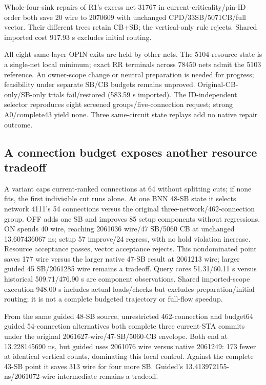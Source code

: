\documentclass[conference,10pt]{IEEEtran}
\begin{document}
Whole-four-sink repairs of R1's excess net 31767 in current-criticality/pin-ID order both save 20 wire to 2070609 with unchanged CPD/33SB/5071CB/full vector. Their different trees retain CB+SB; the vertical-only rule rejects. Shared imported cost 917.93 s excludes initial routing.

All eight same-layer OPIN exits are held by other nets. The 5104-resource state is a single-net local minimum; exact RR terminals across 78450 nets admit the 5103 reference. An owner-scope change or neutral preparation is needed for progress; feasibility under separate SB/CB budgets remains unproved. Original-CB-only/SB-only trials fail/restored (583.59 s imported). The ID-independent selector reproduces eight screened groups/five-connection request; strong A0/complete43 yield none. Three same-circuit state replays add no native repair outcome.

\subsection{A connection budget exposes another resource tradeoff}
A variant caps current-ranked connections at 64 without splitting cuts; if none fits, the first indivisible cut runs alone. At one BNN 48-SB state it selects network 4111's 54 connections versus the original three-network/462-connection group. OFF adds one SB and improves 85 setup components without regressions. ON spends 40 wire, reaching 2061036 wire/47 SB/5060 CB at unchanged 13.607436067 ns; setup 57 improve/24 regress, with no hold violation increase. Resource acceptance passes, vector acceptance rejects. This nondominated point saves 177 wire versus the larger native 47-SB result at 2061213 wire; larger guided 45 SB/2061285 wire remains a tradeoff. Query cores 51.31/60.11 s versus historical 509.71/476.90 s are component observations. Shared imported-scope execution 948.00 s includes actual loads/checks but excludes preparation/initial routing; it is not a complete budgeted trajectory or full-flow speedup.

From the same guided 48-SB source, unrestricted 462-connection and budget64 guided 54-connection alternatives both complete three current-STA commits under the original 2061627-wire/47-SB/5060-CB envelope. Both end at 13.228145690 ns, but guided uses 2061076 wire versus native 2061249: 173 fewer at identical vertical counts, dominating this local control. Against the complete 43-SB point it saves 313 wire for four more SB. Guided's 13.413972155-ns/2061072-wire intermediate remains a tradeoff.
\end{document}
